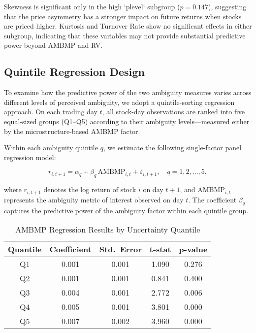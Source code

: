 \documentclass[preprint,12pt,authoryear]{elsarticle}
\begin{document}
Skewness is significant only in the high `plevel` subgroup (\(p = 0.147\)), suggesting that the price asymmetry has a stronger impact on future returns when stocks are priced higher. Kurtosis and Turnover Rate show no significant effects in either subgroup, indicating that these variables may not provide substantial predictive power beyond AMBMP and RV.

\subsection{Quintile Regression Design}

To examine how the predictive power of the two ambiguity measures varies across different levels of perceived ambiguity, we adopt a quintile-sorting regression approach. On each trading day \( t \), all stock-day observations are ranked into five equal-sized groups (Q1–Q5) according to their ambiguity levels—measured either by the microstructure-based AMBMP factor. 

Within each ambiguity quintile \( q \), we estimate the following single-factor panel regression model:

\begin{equation}
r_{i,t+1} = \alpha_q + \beta_q\,\text{AMBMP}_{i,t} + \varepsilon_{i,t+1}, 
\quad q = 1,2,\ldots,5,    
\end{equation}

where \( r_{i,t+1} \) denotes the log return of stock \( i \) on day \( t+1 \), and \( \text{AMBMP}_{i,t} \) represents the ambiguity metric of interest observed on day \( t \). The coefficient \( \beta_q \) captures the predictive power of the ambiguity factor within each quintile group.

\begin{table}[ht]
\centering
\caption{AMBMP Regression Results by Uncertainty Quantile}
\label{tab:ambmp_results}
\begin{tabular}{ccccc}
\toprule
\textbf{Quantile} & \textbf{Coefficient} & \textbf{Std.\ Error} & \textbf{t-stat} & \textbf{p-value} \\
\midrule
Q1 & 0.001 & 0.001 & 1.090 & 0.276 \\
Q2 & 0.001 & 0.001 & 0.841 & 0.400 \\
Q3 & 0.004 & 0.001 & 2.772 & 0.006 \\
Q4 & 0.005 & 0.001 & 3.801 & 0.000 \\
Q5 & 0.007 & 0.002 & 3.960 & 0.000 \\
\bottomrule
\end{tabular}
\end{table}
\end{document}
